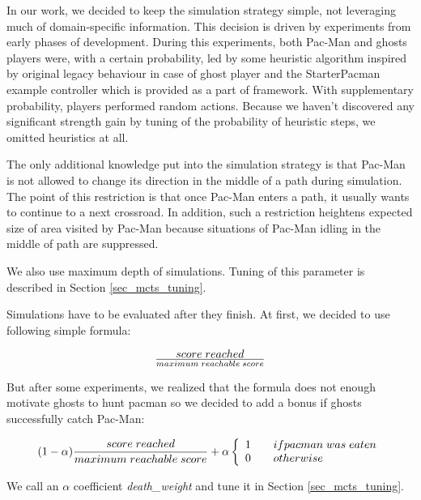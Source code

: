 In our work, we decided to keep the simulation strategy simple, not leveraging much of
domain-specific information. This decision is driven by experiments from early phases of
development. During this experiments, both Pac-Man and ghosts players were, with a certain
probability, led by some heuristic algorithm inspired by original legacy behaviour in case of
ghost player and the StarterPacman example controller which is provided as a part of framework.
With supplementary probability, players performed random actions. Because we haven't discovered
any significant strength gain by tuning of the probability of heuristic steps, we omitted
heuristics at all.

The only additional knowledge put into the simulation strategy is that Pac-Man is not allowed
to change its direction in the middle of a path during simulation. The point of this 
restriction is that once Pac-Man enters a path, it usually wants to continue to a next
crossroad. In addition, such a restriction heightens expected size of area visited by Pac-Man
because situations of Pac-Man idling in the middle of path are suppressed.

We also use maximum depth of simulations. Tuning of this parameter is described in Section
\ref{sec_mcts_tuning}.

Simulations have to be evaluated after they finish. At first, we decided to use following
simple formula:

\begin{equation}
    { score\;reached } \over { maximum\;reachable\;score }
\end{equation}

But after some experiments, we realized that the formula does not enough motivate ghosts to
hunt pacman so we decided to add a bonus if ghosts successfully catch Pac-Man:

\begin{equation}
    (1 - \alpha) {{ score\;reached } \over { maximum\;reachable\;score }}
        + \alpha 
    \left\{
        \begin{array}{c@{\quad\quad}l}
            1 & if pacman\;was\;eaten\\
            0 & otherwise\\
        \end{array}
    \right.
\end{equation}

We call an $\alpha$ coefficient \emph{death\_weight} and tune it in Section
\ref{sec_mcts_tuning}.


